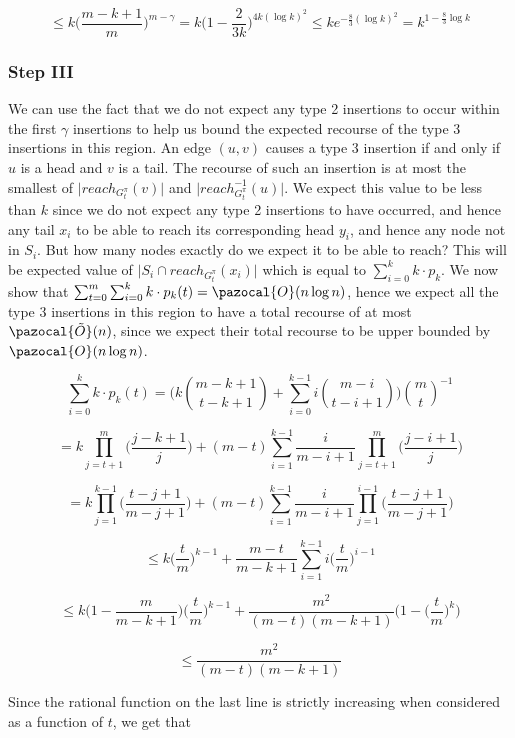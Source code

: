 \documentclass{article}
\begin{document}
\[ \leq k \bigg(\frac{m-k+1}{m}\bigg)^{m-\gamma} = k\bigg(1 - \frac{2}{3k}\bigg)^{4k (\log k)^2} \leq ke^{-\frac{8}{3}(\log k)^2} = k^{1-\frac{8}{3}\log k}\] 

\subsubsection{Step III}

We can use the fact that we do not expect any type 2 insertions to occur within the first $\gamma$ insertions to help us bound the expected recourse of the type 3 insertions in this region. An edge $(u,v)$ causes a type 3 insertion if and only if $u$ is a head and $v$ is a tail. The recourse of such an insertion is at most the smallest of $\vert reach_{G_{t}^{\pi}}(v)\vert$ and $\vert reach^{-1}_{G_{t}^{\pi}}(u)\vert$. We expect this value to be less than $k$ since we do not expect any type 2 insertions to have occurred, and hence any tail $x_{i}$ to be able to reach its corresponding head $y_{i}$, and hence any node not in $S_{i}$. But how many nodes exactly do we expect it to be able to reach? This will be expected value of $\vert S_{i} \cap reach_{G_{t}^{\pi}}(x_{i})\vert$ which is equal to $\sum_{i=0}^{k}k \cdot p_{k}$. We now show that $\sum_{t=0}^{m} \sum_{i=0}^{k}k \cdot p_{k}(t) = \pazocal{O}(n \log n)$, hence we expect all the type 3 insertions in this region to have a total recourse of at most $\pazocal{\tilde{O}}(n)$, since we expect their total recourse to be upper bounded by $\pazocal{O}(n \log n)$.

\[\sum_{i=0}^{k}k \cdot p_{k}(t) = \Bigg(k\binom{m-k+1}{t-k+1} + \sum_{i=0}^{k-1}i\binom{m-i}{t-i+1} \Bigg)\binom{m}{t}^{-1} \]

\[ = k\prod_{j=t+1}^{m}\bigg(\frac{j-k+1}{j}\bigg) + (m-t)\sum_{i=1}^{k-1}\frac{i}{m-i+1} \prod_{j=t+1}^{m}\bigg(\frac{j-i+1}{j}\bigg) \]

\[ = k\prod_{j=1}^{k-1}\bigg(\frac{t-j+1}{m-j+1}\bigg) + (m-t)\sum_{i=1}^{k-1}\frac{i}{m-i+1} \prod_{j=1}^{i-1}\bigg(\frac{t-j+1}{m-j+1}\bigg) \]

\[ \leq k\Big( \frac{t}{m} \Big)^{k-1} + \frac{m-t}{m-k+1}\sum_{i=1}^{k-1}i\Big( \frac{t}{m} \Big)^{i-1} \]

\[ \leq k\bigg(1 - \frac{m}{m-k+1} \bigg)\Big( \frac{t}{m} \Big)^{k-1} + \frac{m^2}{(m-t)(m-k+1)} \bigg(1-\Big( \frac{t}{m} \Big)^{k} \bigg) \]

\[ \leq \frac{m^2}{(m-t)(m-k+1)}\]

Since the rational function on the last line is strictly increasing when considered as a function of $t$, we get that
\end{document}
